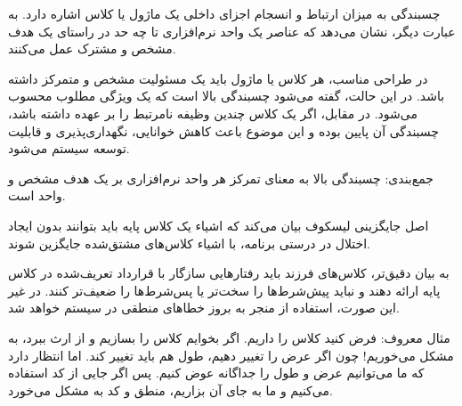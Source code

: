 
چسبندگی به میزان ارتباط و انسجام اجزای داخلی یک ماژول یا کلاس اشاره دارد. به عبارت دیگر، نشان می‌دهد که عناصر یک واحد نرم‌افزاری تا چه حد در راستای یک هدف مشخص و مشترک عمل می‌کنند.

در طراحی مناسب، هر کلاس یا ماژول باید یک مسئولیت مشخص و متمرکز داشته باشد. در این حالت، گفته می‌شود چسبندگی بالا است که یک ویژگی مطلوب محسوب می‌شود. در مقابل، اگر یک کلاس چندین وظیفه نامرتبط را بر عهده داشته باشد، چسبندگی آن پایین بوده و این موضوع باعث کاهش خوانایی، نگهداری‌پذیری و قابلیت توسعه سیستم می‌شود.

{جمع‌بندی:}
چسبندگی بالا به معنای تمرکز هر واحد نرم‌افزاری بر یک هدف مشخص و واحد است.



اصل جایگزینی لیسکوف بیان می‌کند که اشیاء یک کلاس پایه باید بتوانند بدون ایجاد اختلال در درستی برنامه، با اشیاء کلاس‌های مشتق‌شده جایگزین شوند.

به بیان دقیق‌تر، کلاس‌های فرزند باید رفتارهایی سازگار با قرارداد تعریف‌شده در کلاس پایه ارائه دهند و نباید پیش‌شرط‌ها را سخت‌تر یا پس‌شرط‌ها را ضعیف‌تر کنند. در غیر این صورت، استفاده از  منجر به بروز خطاهای منطقی در سیستم خواهد شد.

مثال معروف: فرض کنید کلاس  را داریم. اگر بخوایم کلاس  را بسازیم و از  ارث ببرد، به مشکل می‌خوریم! چون اگر عرض را تغییر دهیم، طول هم باید تغییر کند. اما  انتظار دارد که ما می‌توانیم عرض و طول را جداگانه عوض کنیم. پس اگر جایی از کد  استفاده می‌کنیم و ما به جای آن  بزاریم، منطق و کد به مشکل می‌خورد.

